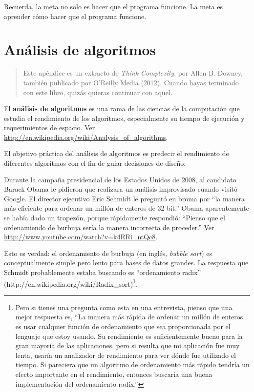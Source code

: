 \documentclass[10pt]{book}
\begin{document}
Recuerda, la meta no solo es hacer que el programa
funcione.  La meta es aprender cómo hacer que el programa funcione.


\chapter{Análisis de algoritmos}
\label{algorithms}

\begin{quote}
Este apéndice es un extracto de {\it Think Complexity}, por
Allen B. Downey, también publicado por O'Reilly Media (2012).  Cuando hayas
terminado con este libro, quizás quieras continuar con aquel.
\end{quote}

El {\bf análisis de algoritmos} es una rama de las ciencias de la computación que
estudia el rendimiento de los algoritmos, especialmente su tiempo de ejecución y
requerimientos de espacio.  Ver
\url{http://en.wikipedia.org/wiki/Analysis_of_algorithms}.
 

El objetivo práctico del análisis de algoritmos es predecir el rendimiento
de diferentes algoritmos con el fin de guiar decisiones de diseño.

Durante la campaña presidencial de los Estados Unidos de 2008, al candidato
Barack Obama le pidieron que realizara un análisis improvisado cuando
visitó Google.  El director ejecutivo Eric Schmidt le preguntó en broma
por ``la manera más eficiente para ordenar un millón de enteros de 32 bit.''
Obama aparentemente se había dado un tropezón, porque rápidamente
respondió: ``Pienso que el ordenamiendo de burbuja sería la manera incorrecta de proceder.''
Ver \url{http://www.youtube.com/watch?v=k4RRi_ntQc8}.

Esto es verdad: el ordenamiento de burbuja (en inglés, {\em bubble sort}) es conceptualmente simple pero lento
para bases de datos grandes.  La respuesta que Schmidt probablemente estaba buscando es
``ordenamiento radix'' (\url{http://en.wikipedia.org/wiki/Radix_sort})\footnote{
Pero si tienes una pregunta como esta en una entrevista, pienso que
una mejor respuesta es, ``La manera más rápida de ordenar un millón de enteros
es usar cualquier función de ordenamiento que sea proporcionada por el lenguaje
que estoy usando.  Su rendimiento es suficientemente bueno para la gran mayoría
de las aplicaciones, pero si resulta que mi aplicación fue muy
lenta, usaría un analizador de rendimiento para ver dónde fue utilizado
el tiempo.  Si pareciera que un algoritmo de ordenamiento más rápido tendría
un efecto importante en el rendimiento, entonces buscaría
una buena implementación del ordenamiento radix.''}.
\end{document}
